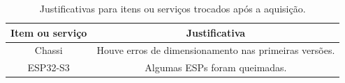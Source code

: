 \begin{landscape}
\begin{table}[htpb]
\begin{center}
\caption{Justificativas para itens ou serviços trocados após a aquisição.}
\begin{tabular}{|c|c|} \hline
\textbf{Item ou serviço} & \textbf{Justificativa}  \\ \hline 
   Chassi &
   Houve erros de dimensionamento nas primeiras versões. \\ \hline
   ESP32-S3 &
   Algumas ESPs foram queimadas. \\ \hline
\end{tabular}
\end{center}
\end{table}

\end{landscape}
